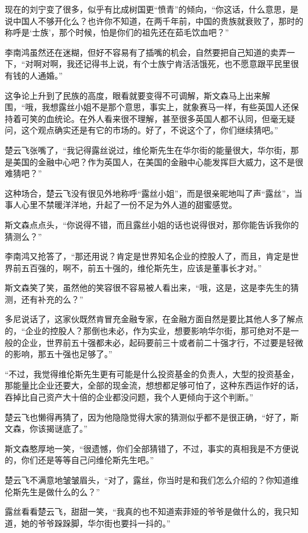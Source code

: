 现在的刘宁变了很多，似乎有比成树国更“愤青”的倾向，“你这话，什么意思，是说中国人不够开化么？也许你不知道，在两千年前，中国的贵族就衰败了，那时的称呼是‘士族’，那个时候，怕是你们的祖先还在茹毛饮血吧？”

李南鸿虽然还在迷糊，但好不容易有了插嘴的机会，自然要把自己知道的卖弄一下，“对啊对啊，我还记得书上说，有个士族宁肯活活饿死，也不愿意跟平民里很有钱的人通婚。”

这争论上升到了民族的高度，眼看就要变得不可调解，斯文森马上出来解围，“哦，我想露丝小姐不是那个意思，事实上，就象赛马一样，有些英国人还保持着可笑的血统论。在外人看来很不理解，甚至很多英国人都不认同，但毫无疑问，这个观点确实还是有它的市场的。好了，不说这个了，你们继续猜吧。”

楚云飞张嘴了，“我记得露丝说过，维伦斯先生在华尔街的能量很大，华尔街，那是美国的金融中心吧？作为英国人，在美国的金融中心能发挥巨大威力，这不是很难猜吧？”

这种场合，楚云飞没有很见外地称呼“露丝小姐”，而是很亲昵地叫了声“露丝”，当事人心里不禁暖洋洋地，升起了一份不足为外人道的甜蜜感觉。

斯文森点点头，“你说得不错，而且露丝小姐的话也说得很对，那你能告诉我你的猜测么？”

李南鸿又抢答了，“那还用说？肯定是世界知名企业的控股人了，而且，肯定是世界前五百强的，啊不，前五十强的，维伦斯先生，应该是董事长才对。”

斯文森笑了笑，虽然他的笑容很不容易被人看出来，“哦，这是，这是李先生的猜测，还有补充的么？”

多尼说话了，这家伙既然肯冒充金融专家，在金融方面自然是要比其他人多了解点的，“企业的控股人？那倒也未必，作为实业，想要影响华尔街，那可绝对不是一般的企业，世界前五十强都未必，起码要前三十或者前二十强才行，不过要是轻微的影响，那五十强也足够了。”

“不过，我觉得维伦斯先生更有可能是什么投资基金的负责人，大型的投资基金，那能量比企业还要大，全部的现金流，想想都足够可怕了，这种东西运作好的话，吞掉比自己资产大十倍的企业都没问题，我个人更倾向于这个判断。”

楚云飞也懒得再猜了，因为他隐隐觉得大家的猜测似乎都不是很正确，“好了，斯文森，你该揭谜底了。”

斯文森憨厚地一笑，“很遗憾，你们全部猜错了，不过，事实的真相我是不方便说的，你们还是等等自己问维伦斯先生吧。”

楚云飞不满意地皱皱眉头，“对了，露丝，你当时是和我们怎么介绍的？你知道维伦斯先生是做什么的么？”

露丝看看楚云飞，甜甜一笑，“我真的也不知道索菲娅的爷爷是做什么的，我只知道，她的爷爷跺跺脚，华尔街也要抖一抖的。”

